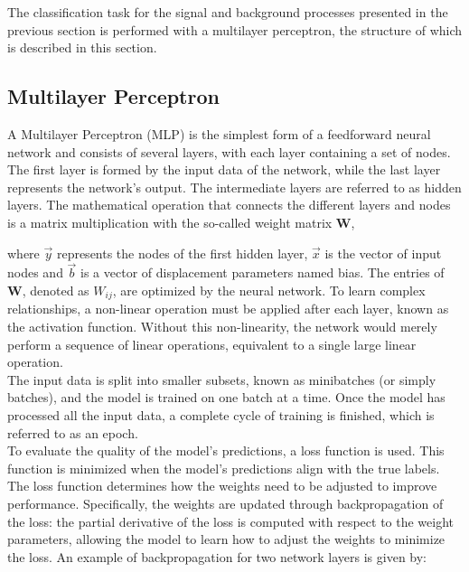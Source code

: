 \label{sec:deepl}

The classification task for the signal and background processes presented in the previous section is performed with a multilayer perceptron,
the structure of which is described in this section.

\subsection{Multilayer Perceptron}
\label{sec:funcmlp}

A Multilayer Perceptron (MLP) is the simplest form of a feedforward neural network and consists of several layers, with each layer containing a set of nodes.
The first layer is formed by the input data of the network, while the last layer represents the network's output. The intermediate layers are referred to as hidden layers.
The mathematical operation that connects the different layers and nodes is a matrix multiplication with the so-called weight matrix $\textbf{W}$,


where $\vec{y}$ represents the nodes of the first hidden layer, $\vec{x}$ is the vector of input nodes and $\vec{b}$ is a vector of displacement parameters named bias.
The entries of $\textbf{W}$, denoted as $W_{ij}$, are optimized by the neural network. To learn complex relationships, a non-linear operation must be applied after each layer, known as the activation function. Without this non-linearity,
the network would merely perform a sequence of linear operations, equivalent to a single large linear operation. \\

The input data is split into smaller subsets, known as minibatches (or simply batches), and the model is trained on one batch at a time. Once the model has processed all the input data,
a complete cycle of training is finished, which is referred to as an epoch. \\

To evaluate the quality of the model's predictions, a loss function is used. This function is minimized when the model's predictions align with the true labels.
The loss function determines how the weights need to be adjusted to improve performance. Specifically, the weights are updated through backpropagation of the loss: the partial derivative of the loss
is computed with respect to the weight parameters, allowing the model to learn how to adjust the weights to minimize the loss. An example of backpropagation for two network layers is given by:

